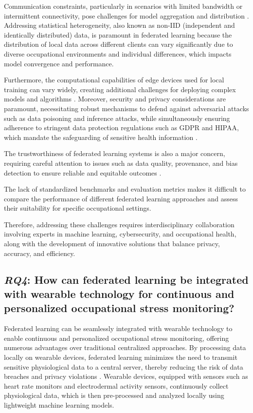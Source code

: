 \documentclass[12pt]{article}
\begin{document}
Communication constraints, particularly in scenarios with limited bandwidth or intermittent connectivity, pose challenges for model aggregation and distribution \cite{tian_li_4bd16a66}. Addressing statistical heterogeneity, also known as non-IID (independent and identically distributed) data, is paramount in federated learning because the distribution of local data across different clients can vary significantly due to diverse occupational environments and individual differences, which impacts model convergence and performance. 

Furthermore, the computational capabilities of edge devices used for local training can vary widely, creating additional challenges for deploying complex models and algorithms \cite{neha_gahlan_d8b04f5d}.  Moreover, security and privacy considerations are paramount, necessitating robust mechanisms to defend against adversarial attacks such as data poisoning and inference attacks, while simultaneously ensuring adherence to stringent data protection regulations such as GDPR and HIPAA, which mandate the safeguarding of sensitive health information \cite{bouacida2021vulnerabilities,adam_sadilek_c59c73f4}.

The trustworthiness of federated learning systems is also a major concern, requiring careful attention to issues such as data quality, provenance, and bias detection to ensure reliable and equitable outcomes \cite{jie_xu_193cbfb6}.

The lack of standardized benchmarks and evaluation metrics makes it difficult to compare the performance of different federated learning approaches and assess their suitability for specific occupational settings. 

Therefore, addressing these challenges requires interdisciplinary collaboration involving experts in machine learning, cybersecurity, and occupational health, along with the development of innovative solutions that balance privacy, accuracy, and efficiency.


\subsection{\textit{RQ4}: How can federated learning be integrated with wearable technology for continuous and personalized occupational stress monitoring?}

Federated learning can be seamlessly integrated with wearable technology to enable continuous and personalized occupational stress monitoring, offering numerous advantages over traditional centralized approaches. By processing data locally on wearable devices, federated learning minimizes the need to transmit sensitive physiological data to a central server, thereby reducing the risk of data breaches and privacy violations \cite{jessica_chia_liu_cd0e0973}. Wearable devices, equipped with sensors such as heart rate monitors and electrodermal activity sensors, continuously collect physiological data, which is then pre-processed and analyzed locally using lightweight machine learning models. 
\end{document}
